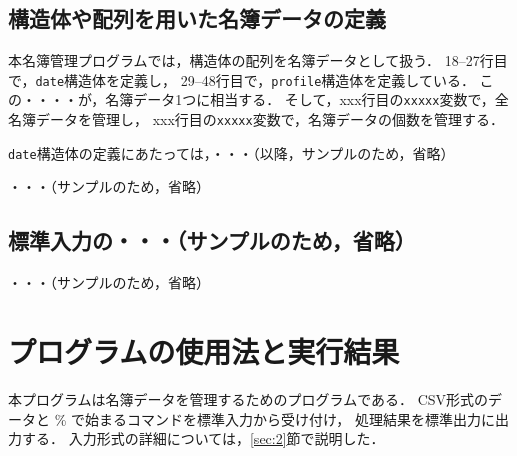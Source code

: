 
\subsection{構造体や配列を用いた名簿データの定義}

本名簿管理プログラムでは，構造体の配列を名簿データとして扱う．
18--27行目で，\verb|date|構造体を定義し，
29--48行目で，\verb|profile|構造体を定義している．
この・・・・が，名簿データ1つに相当する．
そして，xxx行目の\verb|xxxxx|変数で，全名簿データを管理し，
xxx行目の\verb|xxxxx|変数で，名簿データの個数を管理する．

\verb|date|構造体の定義にあたっては，・・・（以降，サンプルのため，省略）

・・・（サンプルのため，省略）

\subsection{標準入力の・・・（\textbf{サンプルのため，省略}）}

・・・（サンプルのため，省略）


\section{プログラムの使用法と実行結果} \label{sec:4}

本プログラムは名簿データを管理するためのプログラムである．
CSV形式のデータと \% で始まるコマンドを標準入力から受け付け，
処理結果を標準出力に出力する．
入力形式の詳細については，\ref{sec:2}節で説明した．

